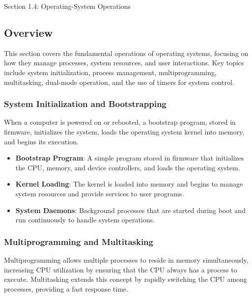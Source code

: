 \begin{notes}{Section 1.4: Operating-System Operations}
    \subsection*{Overview}

    This section covers the fundamental operations of operating systems, focusing on how they manage processes, system resources, and user interactions. Key topics include system initialization, process 
    management, multiprogramming, multitasking, dual-mode operation, and the use of timers for system control.
    
    \subsubsection*{System Initialization and Bootstrapping}
    
    When a computer is powered on or rebooted, a bootstrap program, stored in firmware, initializes the system, loads the operating system kernel into memory, and begins its execution.
    
    \begin{highlight}
    
    \begin{itemize}
        \item \textbf{Bootstrap Program}: A simple program stored in firmware that initializes the CPU, memory, and device controllers, and loads the operating system.
        \item \textbf{Kernel Loading}: The kernel is loaded into memory and begins to manage system resources and provide services to user programs.
        \item \textbf{System Daemons}: Background processes that are started during boot and run continuously to handle system operations.
    \end{itemize}
    
    \end{highlight}
    
    \subsubsection*{Multiprogramming and Multitasking}
    
    Multiprogramming allows multiple processes to reside in memory simultaneously, increasing CPU utilization by ensuring that the CPU always has a process to execute. Multitasking extends this concept 
    by rapidly switching the CPU among processes, providing a fast response time.
    

\end{notes}
